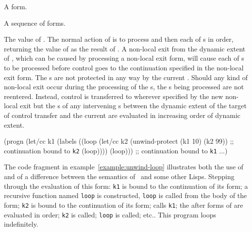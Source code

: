 \begin{optDefinition}
%
\Syntax
{}%
%
\begin{arguments}
    \item[\scdef{protected-form}] A form.
    \item[\scseqref{after-form}] A sequence of forms.
\end{arguments}
%
\result%
The value of .
%
\remarks%
The normal action of  is to process
 and then each of s in order, returning
the value of  as the result of .
A non-local exit from the dynamic extent of , which can be
caused by processing a non-local exit form, will cause each of
s to be processed before control goes to the continuation
specified in the non-local exit form.  The s are not protected
in any way by the current .  Should any kind of
non-local exit occur during the processing of the s, the
s being processed are not reentered.  Instead, control is
transferred to wherever specified by the new non-local exit but the
s of any intervening s between the
dynamic extent of the target of control transfer and the current
 are evaluated in increasing order of dynamic extent.
%
\examples
%
\begin{example}
\label{example:unwind-loop}
{\syntax
(progn
  (let/cc k1
    (labels
      ((loop
         (let/cc k2 (unwind-protect (k1 10) (k2 99))
         ;; continuation bound to {\tt k2}
         (loop))))
      (loop)))
  ;; continuation bound to {\tt k1}
  ...)
\endsyntax}
\end{example}
%
The code fragment in example~\ref{example:unwind-loop} illustrates both the use
of  and of a difference between the semantics of
\eulisp\ and some other Lisps.  Stepping through the evaluation of this form:
{\tt k1} is bound to the continuation of its  form; a
recursive function named {\tt loop} is constructed, {\tt loop} is called from
the body of the  form; {\tt k2} is bound to the continuation
of its  form;  calls {\tt k1}; the
after forms of  are evaluated in order; {\tt k2} is
called; {\tt loop} is called; etc..  This program loops indefinitely.
%
\end{optDefinition}

